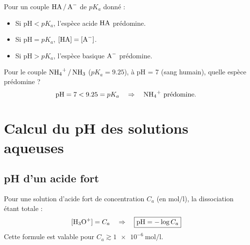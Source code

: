 \begin{propriete}
Pour un couple $\ce{HA / A-}$ de $pK_a$ donné :
\begin{itemize}
    \item Si $\text{pH} < pK_a$, l'espèce acide $\ce{HA}$ prédomine.
    \item Si $\text{pH} = pK_a$, $[\ce{HA}] = [\ce{A-}]$.
    \item Si $\text{pH} > pK_a$, l'espèce basique $\ce{A-}$ prédomine.
\end{itemize}
\end{propriete}

\begin{illus}
\centering
{}
\end{illus}

\begin{exemple}
Pour le couple $\ce{NH4+ / NH3}$ ($pK_a = 9.25$), à pH = 7 (sang humain), quelle espèce prédomine ?
\[
\text{pH} = 7 < 9.25 = pK_a \quad \Rightarrow \quad \text{$\ce{NH4+}$ prédomine.}
\]
\end{exemple}

\section{Calcul du pH des solutions aqueuses}

\subsection{pH d'un acide fort}

\begin{propriete}
Pour une solution d'acide fort de concentration $C_a$ (en $\si{\mol\per\litre}$), la dissociation étant totale :
\[
[\ce{H3O+}] = C_a \quad \Rightarrow \quad \boxed{\text{pH} = -\log C_a}
\]
Cette formule est valable pour $C_a \gtrsim \SI{1e-6}{\mol\per\litre}$.
\end{propriete}

